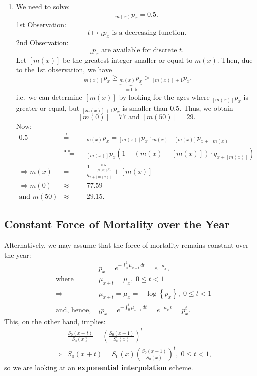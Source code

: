 \documentclass[11pt,fleqn,oneside]{book}
\begin{document}
\begin{enumerate}
\item
We need to solve:
$$
{_{m(x)}p_x} = 0.5.
$$
1st Observation:
$$
t \mapsto {_tp_x} \text{ is a decreasing function}.
$$
2nd Observation:
$$
{_tp_x} \text{ are available for discrete }t.
$$
Let $[m(x)]$ be the greatest integer smaller or equal to $m(x)$. Then, due to the 1st observation, we have
$$
{_{[m(x)]}p_x}  \geq \underbrace{{_{m(x)}p_x}}_{=0.5}  > {_{[m(x)]+1}p_x},
$$
i.e.\ we can determine $[m(x)]$ by looking for the ages where ${_{[m(x)]}p_x} $ is greater or equal, but  ${_{[m(x)]+1}p_x} $ is smaller than 0.5. Thus, we obtain
$$
[m(0)] = 77 \text{ and } [m(50)] = 29.
$$
Now:
\begin{eqnarray*}
0.5 &\stackrel{!}{=}& {_{m(x)}p_x} = {_{[m(x)]}p_x}\cdot {_{m(x)-[m(x)]}p_{x+[m(x)]}}\\
&\stackrel{\text{unif.\ dist.}}{=}&   {_{[m(x)]}p_x} \left( 1- (m(x)-[m(x)])\cdot{q_{x+[m(x)]}}\right)\\
\Rightarrow m(x) &=& \frac{1 -\frac{0.5}{_{[m(x)]}p_x}}{q_{x+[m(x)]}} + [m(x)]\\
\Rightarrow m(0) &\approx& 77.59\\
\text{and }  m(50) &\approx& 29.15.
\end{eqnarray*}
\end{enumerate}

\normalsize

\subsection*{Constant Force of Mortality over the Year}

Alternatively, we may assume that the force of mortality remains constant over the year:
\begin{eqnarray*}
&& p_x = e^{-\int_0^1 \mu_{x+t}\,dt} = e^{-\mu_x},\\
&\text{where }& \mu_{x+t} = \mu_{x},\;0 \leq t < 1\\
&\Rightarrow& \mu_{x+t} = \mu_x = -\log\left\{p_x\right\},\;0 \leq t < 1 \\
&\text{and, hence, }& {_tp_x} = e^{-\int_0^t \mu_{x+t}\,dt} = e^{-\mu_x\,t} = p_x^t.
\end{eqnarray*}
This, on the other hand, implies:
\begin{eqnarray*}
&& \frac{S_0(x+t)}{S_0(x)} = \left(\frac{S_0(x+1)}{S_0(x)}\right)^t \\
&\Rightarrow& S_0(x+t) = S_0(x)\left(\frac{S_0(x+1)}{S_0(x)}\right)^t,\;0\leq t < 1,
\end{eqnarray*}
so we are looking at an \textbf{exponential interpolation} scheme.
\end{document}
